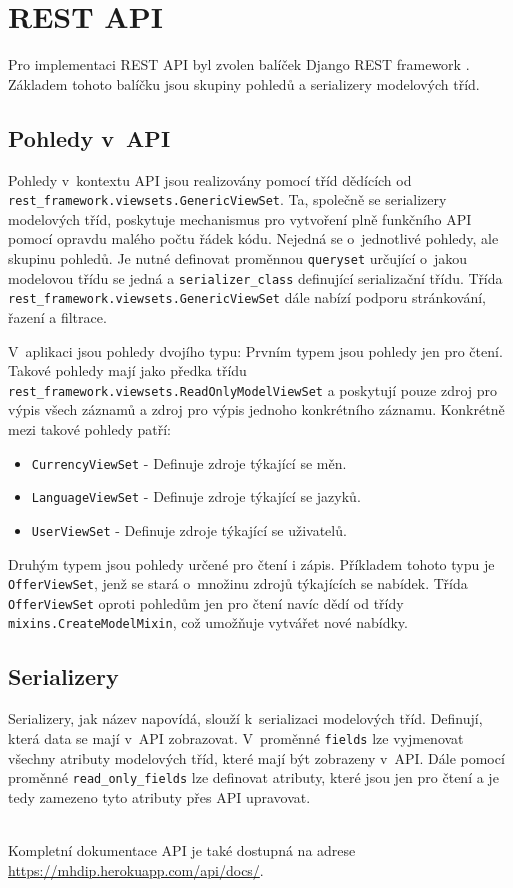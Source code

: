 \section{REST API}
Pro implementaci REST API byl zvolen balíček Django REST framework \cite{django-rest-framework}. Základem tohoto balíčku jsou skupiny pohledů a serializery modelových tříd.

\subsection{Pohledy v~API}
\begin{sloppypar}
Pohledy v~kontextu API jsou realizovány pomocí tříd dědících od \texttt{rest\_framework.viewsets.GenericViewSet}. Ta, společně se serializery modelových tříd, poskytuje mechanismus pro vytvoření plně funkčního API pomocí opravdu malého počtu řádek kódu. Nejedná se o~jednotlivé pohledy, ale skupinu pohledů. Je nutné definovat proměnnou \texttt{queryset} určující o~jakou modelovou třídu se jedná a \texttt{serializer\_class} definující serializační třídu. Třída \texttt{rest\_framework.viewsets.GenericViewSet} dále nabízí podporu stránkování, řazení a filtrace.

V~aplikaci jsou pohledy dvojího typu:
Prvním typem jsou pohledy jen pro čtení. Takové pohledy mají jako předka třídu \texttt{rest\_framework.viewsets.ReadOnlyModelViewSet} a poskytují pouze zdroj pro výpis všech záznamů a zdroj pro výpis jednoho konkrétního záznamu. Konkrétně mezi takové pohledy patří:
\begin{itemize}
    \item \texttt{CurrencyViewSet} - Definuje zdroje týkající se měn.
    \item \texttt{LanguageViewSet} - Definuje zdroje týkající se jazyků.
    \item \texttt{UserViewSet} - Definuje zdroje týkající se uživatelů.
\end{itemize}

Druhým typem jsou pohledy určené pro čtení i zápis. Příkladem tohoto typu je \texttt{OfferViewSet}, jenž se stará o~množinu zdrojů týkajících se nabídek. Třída \texttt{OfferViewSet} oproti pohledům jen pro čtení navíc dědí od třídy \texttt{mixins.CreateModelMixin}, což umožňuje vytvářet nové nabídky.
\end{sloppypar}

\subsection{Serializery}
Serializery, jak název napovídá, slouží k~serializaci modelových tříd. Definují, která data se mají v~API zobrazovat. V~proměnné \texttt{fields} lze vyjmenovat všechny atributy modelových tříd, které mají být zobrazeny v~API. Dále pomocí proměnné \texttt{read\_only\_fields} lze definovat atributy, které jsou jen pro čtení a je tedy zamezeno tyto atributy přes API upravovat.
\\\\

\begin{sloppypar}
Kompletní dokumentace API je také dostupná na adrese \href{https://mhdip.herokuapp.com/api/docs/}{https://mhdip.herokuapp.com/api/docs/}.
\end{sloppypar}